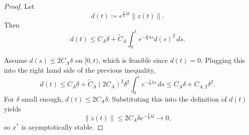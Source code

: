 \documentclass{tufte-handout}
\theoremstyle{definition}
\begin{document}
\begin{proof}
	Let
	\[
	d(t)\coloneqq e^{\frac{2}{3}\lambda t}\|z(t)\|.
	\]
	Then
	\[
	d(t) \le C_A\delta + \tilde C_A \int_0^t e^{-\frac{2}{3}\lambda s} d(s)^2\,ds.
	\]

	Assume $d(s)\le 2C_A\delta$ on $[0,t)$, which is feasible since $d(t) = 0$. Plugging this into the right hand side of the previous inequality,
	\[
	d(t) \le C_A\delta + \tilde C_A (2C_A)^2 \delta^2
	\int_0^t e^{-\frac{2}{3}\lambda s}\,ds
	\le C_A\delta + C_{A,2}\delta^2.
	\]
	For $\delta$ small enough, $d(t)\le 2C_A\delta$. Substituting this into the definition of $d(t)$ yields
	\[
	\|z(t)\|\le 2C_A \delta e^{-\frac{2}{3}\lambda t}\to 0,
	\]
	so $x^*$ is asymptotically stable.

\end{proof}
\end{document}
